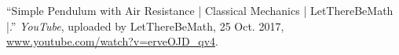 \begin{thebibliography}{12}









“Simple Pendulum with Air Resistance | Classical Mechanics | LetThereBeMath |.” \emph{YouTube}, uploaded by LetThereBeMath, 25 Oct. 2017, \url{www.youtube.com/watch?v=erveOJD\_qv4}.





\end{thebibliography}
